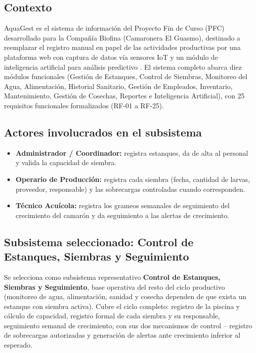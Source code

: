 \documentclass[11pt,a4paper]{article}
\begin{document}
\subsection{Contexto}
AquaGest es el sistema de información del Proyecto Fin de Curso (PFC) desarrollado
para la Compañía Biofina (Camaronera El Guasmo), destinado a reemplazar el registro
manual en papel de las actividades productivas por una plataforma web con captura de
datos vía sensores IoT y un módulo de inteligencia artificial para análisis
predictivo \cite{aquagest2026}. El sistema completo abarca diez módulos funcionales
(Gestión de Estanques, Control de Siembras, Monitoreo del Agua, Alimentación,
Historial Sanitario, Gestión de Empleados, Inventario, Mantenimiento, Gestión de
Cosechas, Reportes e Inteligencia Artificial), con 25 requisitos funcionales
formalizados (RF-01 a RF-25).

\subsection{Actores involucrados en el subsistema}
\begin{itemize}[leftmargin=1.5em]
    \item \textbf{Administrador / Coordinador:} registra estanques, da de alta al
    personal y valida la capacidad de siembra.
    \item \textbf{Operario de Producción:} registra cada siembra (fecha, cantidad
    de larvas, proveedor, responsable) y las sobrecargas controladas cuando
    corresponden.
    \item \textbf{Técnico Acuícola:} registra los grameos semanales de seguimiento
    del crecimiento del camarón y da seguimiento a las alertas de crecimiento.
\end{itemize}

\subsection{Subsistema seleccionado: Control de Estanques, Siembras y Seguimiento}
Se selecciona como subsistema representativo \textbf{Control de Estanques,
Siembras y Seguimiento}, base operativa del resto del ciclo productivo
(monitoreo de agua, alimentación, sanidad y cosecha dependen de que exista un
estanque con siembra activa). Cubre el ciclo completo: registro de la piscina y
cálculo de capacidad, registro formal de cada siembra y su responsable,
seguimiento semanal de crecimiento, con sus dos mecanismos de control -- registro
de sobrecargas autorizadas y generación de alertas ante crecimiento inferior al
esperado.
\end{document}
